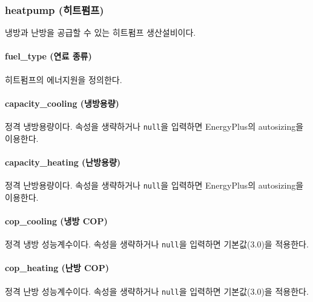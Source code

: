 \subsubsection{heatpump (히트펌프)} \label{subsubsection:ioref:heatpump}

냉방과 난방을 공급할 수 있는 히트펌프 생산설비이다.


\paragraph{fuel\_type (연료 종류)} 히트펌프의 에너지원을 정의한다.

\paragraph{capacity\_cooling (냉방용량)} 정격 냉방용량이다. 속성을 생략하거나 \texttt{null}을 입력하면 EnergyPlus의 autosizing을 이용한다.

\paragraph{capacity\_heating (난방용량)} 정격 난방용량이다. 속성을 생략하거나 \texttt{null}을 입력하면 EnergyPlus의 autosizing을 이용한다.

\paragraph{cop\_cooling (냉방 COP)} 정격 냉방 성능계수이다. 속성을 생략하거나 \texttt{null}을 입력하면 기본값(3.0)을 적용한다.

\paragraph{cop\_heating (난방 COP)} 정격 난방 성능계수이다. 속성을 생략하거나 \texttt{null}을 입력하면 기본값(3.0)을 적용한다.

